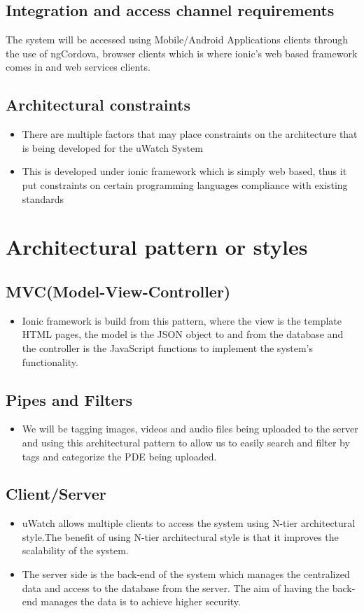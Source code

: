 \documentclass[a4paper,12pt]{article}
\begin{document}
\subsection{Integration and access channel requirements}
The system will be accessed using Mobile/Android Applications clients through the use of ngCordova,  browser clients which is where ionic's web based framework comes in and web services clients.
\subsection{Architectural constraints}
\begin{itemize}
\item There are multiple factors that may place constraints on the architecture that
is being developed for the uWatch System

\item This is developed under ionic framework which is simply web based, thus it put constraints on certain programming languages compliance with existing standards
\end{itemize}
\section{Architectural pattern or styles}
		\subsection{MVC(Model-View-Controller)}
			\begin{itemize}
				\item Ionic framework is build from this pattern, where the view is the template HTML pages, the model is the JSON object to and from the database and the controller is the JavaScript functions to implement the system's functionality.
			\end{itemize}
		\subsection{Pipes and Filters}
		\begin{itemize}
		\item We will be tagging images, videos and audio files being uploaded to the server and using this architectural pattern to allow us to easily search and filter by tags and categorize the PDE being uploaded.
		\end{itemize}
		\subsection{Client/Server} 
			\begin{itemize}
				\item uWatch allows multiple clients to access the system using N-tier
				architectural style.The benefit of using N-tier architectural style is that
				it improves the scalability of the system.
				\item The server side is the back-end of the system which manages the centralized data and access to the database from the server. The aim of
having the back-end manages the data is to achieve higher security. 
			\end{itemize}
\end{document}
